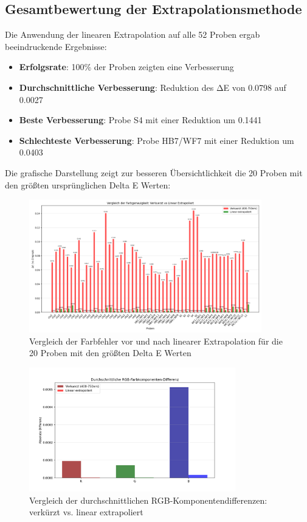\subsection{Gesamtbewertung der Extrapolationsmethode}

Die Anwendung der linearen Extrapolation auf alle 52 Proben ergab beeindruckende Ergebnisse:

\begin{itemize}
    \item \textbf{Erfolgsrate}: 100\% der Proben zeigten eine Verbesserung
    \item \textbf{Durchschnittliche Verbesserung}: Reduktion des ΔE von 0.0798 auf 0.0027
    \item \textbf{Beste Verbesserung}: Probe S4 mit einer Reduktion um 0.1441
    \item \textbf{Schlechteste Verbesserung}: Probe HB7/WF7 mit einer Reduktion um 0.0403
\end{itemize}

Die grafische Darstellung zeigt zur besseren Übersichtlichkeit die 20 Proben mit den größten ursprünglichen Delta E Werten:

\begin{figure}[htbp]
    \centering
    \includegraphics[width=0.9\textwidth]{./figures/delta_e_vergleich_alle_proben.png}
    \caption{Vergleich der Farbfehler vor und nach linearer Extrapolation für die 20 Proben mit den größten Delta E Werten}
    \label{fig:extrapolation_comparison}
\end{figure}

\begin{figure}[htbp]
    \centering
    \includegraphics[width=0.8\textwidth]{./figures/rgb_diff_comparison.png}
    \caption{Vergleich der durchschnittlichen RGB-Komponentendifferenzen: verkürzt vs. linear extrapoliert}
    \label{fig:rgb_extrapolation_comparison}
\end{figure}

